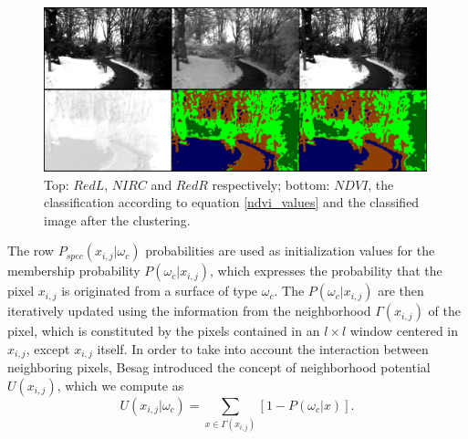 \documentclass[letterpaper, 10pt, conference]{ieeeconf}      %
\begin{document}
\begin{figure}[t!]
      \vspace{2mm}\centering
      \includegraphics[width=0.99\textwidth]{../images/frame_1.jpg}\vspace{-1mm}
      \caption{Top: $RedL$, $NIRC$ and $RedR$ respectively; bottom: $NDVI$, the classification according to equation \eqref{ndvi_values} and the classified image after the clustering.}
       \label{fig:frame1}
       \vspace{-3mm}
\end{figure}

The row $P_{spec}(x_{i,j}|\omega_c)$ probabilities are used as initialization values for the membership probability $P(\omega_c | x_{i,j})$, which expresses the probability that the pixel $x_{i,j}$ is originated from a surface of type $\omega_c$.
The $P(\omega_c | x_{i,j})$ are then iteratively updated using the information from the neighborhood  $\Gamma (x_{i,j})$ of the pixel, which is constituted by the pixels contained in an $l\times l $  window centered in $x_{i,j}$, except $x_{i,j}$ itself. 
In order to take into account the interaction between neighboring pixels, Besag \cite{1986_besag} introduced the concept of  neighborhood potential $U(x_{i,j})$, which we compute as
%
\begin{equation} \label{U}
U(x_{i,j}|\omega_c) =   \sum_{x\in \Gamma (x_{i,j}) } [1-P(\omega_c|x)].
\end{equation}
%
%
%
%
%
%
\end{document}
